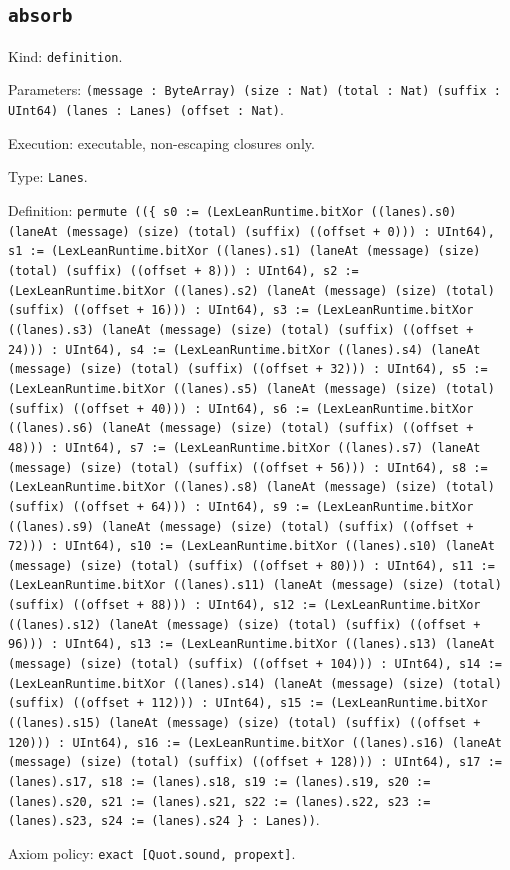 \documentclass[11pt]{article}
\begin{document}
\subsection*{\texttt{absorb}}
\noindent Kind: \texttt{definition}.\par
\noindent Parameters: \texttt{(message : ByteArray) (size : Nat) (total : Nat) (suffix : UInt64) (lanes : Lanes) (offset : Nat)}.\par
\noindent Execution: executable, non-escaping closures only.\par
\noindent Type: \texttt{Lanes}.\par
\noindent Definition: \texttt{permute ((\{ s0 := (LexLeanRuntime.bitXor ((lanes).s0) (laneAt (message) (size) (total) (suffix) ((offset + 0))) : UInt64), s1 := (LexLeanRuntime.bitXor ((lanes).s1) (laneAt (message) (size) (total) (suffix) ((offset + 8))) : UInt64), s2 := (LexLeanRuntime.bitXor ((lanes).s2) (laneAt (message) (size) (total) (suffix) ((offset + 16))) : UInt64), s3 := (LexLeanRuntime.bitXor ((lanes).s3) (laneAt (message) (size) (total) (suffix) ((offset + 24))) : UInt64), s4 := (LexLeanRuntime.bitXor ((lanes).s4) (laneAt (message) (size) (total) (suffix) ((offset + 32))) : UInt64), s5 := (LexLeanRuntime.bitXor ((lanes).s5) (laneAt (message) (size) (total) (suffix) ((offset + 40))) : UInt64), s6 := (LexLeanRuntime.bitXor ((lanes).s6) (laneAt (message) (size) (total) (suffix) ((offset + 48))) : UInt64), s7 := (LexLeanRuntime.bitXor ((lanes).s7) (laneAt (message) (size) (total) (suffix) ((offset + 56))) : UInt64), s8 := (LexLeanRuntime.bitXor ((lanes).s8) (laneAt (message) (size) (total) (suffix) ((offset + 64))) : UInt64), s9 := (LexLeanRuntime.bitXor ((lanes).s9) (laneAt (message) (size) (total) (suffix) ((offset + 72))) : UInt64), s10 := (LexLeanRuntime.bitXor ((lanes).s10) (laneAt (message) (size) (total) (suffix) ((offset + 80))) : UInt64), s11 := (LexLeanRuntime.bitXor ((lanes).s11) (laneAt (message) (size) (total) (suffix) ((offset + 88))) : UInt64), s12 := (LexLeanRuntime.bitXor ((lanes).s12) (laneAt (message) (size) (total) (suffix) ((offset + 96))) : UInt64), s13 := (LexLeanRuntime.bitXor ((lanes).s13) (laneAt (message) (size) (total) (suffix) ((offset + 104))) : UInt64), s14 := (LexLeanRuntime.bitXor ((lanes).s14) (laneAt (message) (size) (total) (suffix) ((offset + 112))) : UInt64), s15 := (LexLeanRuntime.bitXor ((lanes).s15) (laneAt (message) (size) (total) (suffix) ((offset + 120))) : UInt64), s16 := (LexLeanRuntime.bitXor ((lanes).s16) (laneAt (message) (size) (total) (suffix) ((offset + 128))) : UInt64), s17 := (lanes).s17, s18 := (lanes).s18, s19 := (lanes).s19, s20 := (lanes).s20, s21 := (lanes).s21, s22 := (lanes).s22, s23 := (lanes).s23, s24 := (lanes).s24 \} : Lanes))}.\par
\noindent Axiom policy: \texttt{exact [Quot.sound, propext]}.\par
\end{document}
